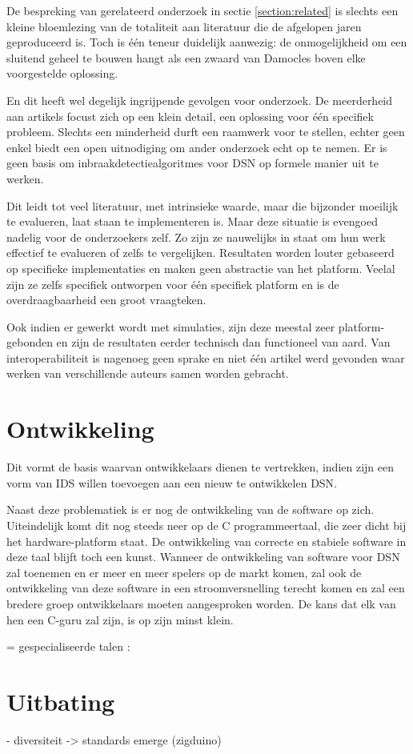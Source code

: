De bespreking van gerelateerd onderzoek in sectie \ref{section:related} is
slechts een kleine bloemlezing van de totaliteit aan literatuur die de
afgelopen jaren geproduceerd is. Toch is \'e\'en teneur duidelijk aanwezig: de
onmogelijkheid om een sluitend geheel te bouwen hangt als een zwaard van
Damocles boven elke voorgestelde oplossing.

En dit heeft wel degelijk ingrijpende gevolgen voor onderzoek. De meerderheid
aan artikels focust zich op een klein detail, een oplossing voor \'e\'en
specifiek probleem. Slechts een minderheid durft een raamwerk voor te stellen,
echter geen enkel biedt een open uitnodiging om ander onderzoek echt op te
nemen. Er is geen basis om inbraakdetectiealgoritmes voor DSN op formele manier
uit te werken.

Dit leidt tot veel literatuur, met intrinsieke waarde, maar die bijzonder
moeilijk te evalueren, laat staan te implementeren is. Maar deze situatie is
evengoed nadelig voor de onderzoekers zelf. Zo zijn ze nauwelijks in staat om
hun werk effectief te evalueren of zelfs te vergelijken. Resultaten worden
louter gebaseerd op specifieke implementaties en maken geen abstractie van het
platform. Veelal zijn ze zelfs specifiek ontworpen voor \'e\'en specifiek
platform en is de overdraagbaarheid een groot vraagteken.

Ook indien er gewerkt wordt met simulaties, zijn deze meestal zeer
platform-gebonden en zijn de resultaten eerder technisch dan functioneel van
aard. Van interoperabiliteit is nagenoeg geen sprake en niet \'e\'en artikel
werd gevonden waar werken van verschillende auteurs samen worden gebracht.

\section{Ontwikkeling}
\label{section:problem-develop}

Dit vormt de basis waarvan ontwikkelaars dienen te vertrekken, indien zijn een
vorm van IDS willen toevoegen aan een nieuw te ontwikkelen DSN. 

\TODO

Naast deze problematiek is er nog de ontwikkeling van de software op zich.
Uiteindelijk komt dit nog steeds neer op de C programmeertaal, die zeer dicht
bij het hardware-platform staat. De ontwikkeling van correcte en stabiele
software in deze taal blijft toch een kunst. Wanneer de ontwikkeling van
software voor DSN zal toenemen en er meer en meer spelers op de markt komen,
zal ook de ontwikkeling van deze software in een stroomversnelling terecht
komen en zal een bredere groep ontwikkelaars moeten aangesproken worden. De
kans dat elk van hen een C-guru zal zijn, is op zijn minst klein.

\TODO

= gespecialiseerde talen : \citep{bai2009archetype}

\section{Uitbating}
\label{section:problem-operations}

\TODO

- diversiteit -> standards emerge (zigduino)
